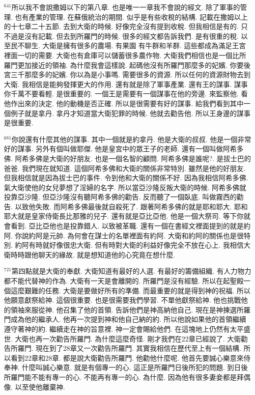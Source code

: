 \documentclass{book}
\begin{document}
$^{641}$所以我不會說撒姆以下的第八章.
也是唯一一章我不會說的經文.
除了軍事的管理.
也有產業的管理.
在蘇俄統治的期間.
似乎是有些收稅的結構.
記載在撒姆以上的十七章二十五節.
去到大衛的時候.
好像完全沒有提到收稅.
但我相信是有的.
只不過是沒有記載.
但去到所羅門的時候.
很多的經文都告訴我們.
是有很重的稅.
以至民不聊生.
大衛是擁有很多的農場.
有果園 有牛群和羊群.
這些都成為滿足王宮裡面一切的需要.
大衛也有倉庫可以儲蓄很多農作物.
大衛我們相信也是一個比所羅門更加接近的領袖.
為什麼我會這樣說.
起碼他沒有所羅門那麼多的妃嬪.
你要後宮三千那麼多的妃嬪.
你以為是小事嗎.
需要很多的資源.
所以任何的資源財物去到大衛.
我相信是能夠發揮更大的作用.
還有就是除了軍事產業.
還有王的謀事.
謀事你千萬不要看輕.
是很重要的.
一個王是需要有一個謀事在他的旁邊.
來監察他.
看他作出來的決定.
他的動機是否正確.
所以是很需要有好的謀事.
給我們看到其中一個例子就是拿丹.
拿丹才知道當大衛犯罪的時候.
他就去勸告他.
所以王身邊的謀事是很重要.

$^{681}$你說還有什麼其他的謀事.
其中一個就是約拿丹.
他是大衛的叔叔.
他是一個非常好的謀事.
另外有個叫做耶傑.
他是皇宮中的眾王子的老師.
還有一個叫做阿希多佛.
阿希多佛是大衛的好朋友.
也是一個名智的顧問.
阿希多佛是誰呢?.
是拔士巴的爸爸.
我們現在就知道.
這個阿希多佛和大衛的關係非常特別.
雖然是他的好朋友.
但我相信就是因為拔士巴的事件.
令到他和大衛的關係不好.
因為我相信阿希多佛.
氣大衛使他的女兒夢想了淫婦的名字.
所以當亞沙隆反叛大衛的時候.
阿希多佛就投靠亞沙隆.
但亞沙隆沒有聽阿希多佛的勸告.
反而聽了一個臥底.
叫做霧西的勸告.
以致他失敗.
而阿希多佛最後就自殺死了.
跟著阿希多佛的就是耶和耶大.
耶和耶大就是皇家侍衛長比那雅的兒子.
還有就是亞比亞他.
他是一個大祭司.
等下你就會看到.
亞比亞他也是投靠錯人.
以致被革職.
還有一個在書經文裡面提到的就是約阿.
你說約阿是元帥.
為何會在謀士的名單裡面有約阿.
大衛和約阿的關係也是很特別.
約阿有時就好像很忠大衛.
但有時對大衛的利益好像完全不放在心上.
我相信大衛時時跟他聊天的緣故.
就是想知道他的心究竟在想什麼.

$^{721}$第四點就是大衛的奉獻.
大衛知道有最好的人選.
有最好的籌備組織.
有人力物力都不能代替神的作為.
大衛有一天是會離開的.
所羅門是沒有經驗.
所以在起聖殿一個這麼艱難的任務.
大衛是要做好所有的準備.
而最重要的就是得到神的祝福.
所以他願意獻祭給神.
這個很重要.
也是很需要我們學習.
不單他獻祭給神.
他也挑戰他的領袖來服從神.
他召集了他的首領.
告訴他們是神高納他自己.
現在是神揀選所羅門成為他的繼承人.
他再一次提到神和他自己納的約.
所以他說如果他的首領繼續遵守著神的約.
繼續走在神的旨意裡.
神一定會賜給他們.
在這塊地上仍然有太平盛世.
大衛也再一次勸告所羅門.
為什麼這麼奇怪.
剛才我們在22章已經說了.
大衛勸告所羅門.
現在到了28章又一次勸告所羅門.
其實我相信在歷代至上有一個結構.
所以看到22章和28章.
都是說大衛勸告所羅門.
他勸他什麼呢.
他首先要誠心樂意來侍奉神.
什麼叫誠心樂意.
就是有個專一的心.
這正是所羅門日後所犯的問題.
到日後所羅門能不能有專一的心.
不能再有專一的心.
為什麼.
因為他有很多妻妾都是拜偶像.
以至使他離棄神.
\end{document}
